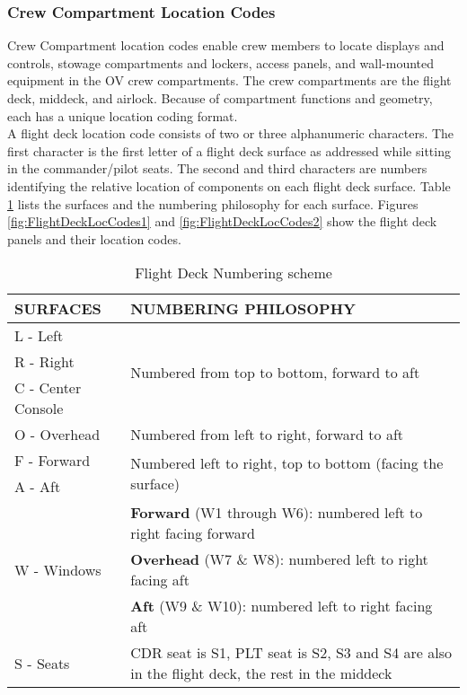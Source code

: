 \documentclass[Space_Shuttle_Vessel_Manual.tex]{subfiles}
\begin{document}
\begin{multicols*}{2}
\subsubsection{Crew Compartment Location Codes}
Crew Compartment location codes enable crew members to locate displays and controls, stowage compartments and lockers, access panels, and wall-mounted equipment in the OV crew compartments. The crew compartments are the flight deck, middeck, and airlock. Because of compartment functions and geometry, each has a unique location coding format.
\\
A flight deck location code consists of two or three alphanumeric characters. The first character is the first letter of a flight deck surface as addressed while sitting in the commander/pilot seats.
The second and third characters are numbers identifying the relative location of components on each flight deck surface. Table \ref{tab:PanelNumbering} lists the surfaces and the numbering philosophy for each surface.
Figures \ref{fig:FlightDeckLocCodes1} and \ref{fig:FlightDeckLocCodes2} show the flight deck panels and their location codes.
\begin{table}[H]
  \begin{tabularx}{\linewidth}{l | X}
    SURFACES & NUMBERING PHILOSOPHY \\
    \hline
    L - Left & \multirow{3}{\linewidth}{Numbered from top to bottom, forward to aft} \\
    R - Right & \\
    C - Center Console & \\
    \hline
    O - Overhead & Numbered from left to right, forward to aft \\
    \hline
    F - Forward & \multirow{2}{\linewidth}{Numbered left to right, top to bottom (facing the surface)} \\
    A - Aft & \\
    \hline
    \multirow{3}{*}{W - Windows} & \textbf{Forward} (W1 through W6): numbered left to right facing forward \\
    & \textbf{Overhead} (W7 \& W8): numbered left to right facing aft \\
    & \textbf{Aft} (W9 \& W10): numbered left to right facing aft \\
    \hline
    S - Seats & CDR seat is S1, PLT seat is S2, S3 and S4 are also in the flight deck, the rest in the middeck
  \end{tabularx}
  \caption{Flight Deck Numbering scheme}
  \label{tab:PanelNumbering}
\end{table}
\end{multicols*}
\end{document}
